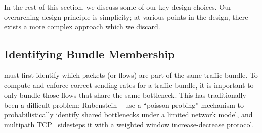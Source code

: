 
In the rest of this section, we discuss some of our key design choices.
Our overarching design principle is simplicity; at various points in the design, there exists a more complex approach which we discard.

\subsection{Identifying Bundle Membership}\label{s:design:membership}
\name must first identify which packets (or flows) are part of the same traffic bundle.
To compute and enforce correct sending rates for a traffic bundle, it is important to only bundle those flows that share the same bottleneck.
This has traditionally been a difficult problem; 
Rubenstein \etal~\cite{active-sharedbottlenecks} use a ``poisson-probing'' mechanism to probabilistically identify shared bottlenecks under a limited network model, and
multipath TCP~\cite{mptcp} sidesteps it with a weighted window increase-decrease protocol.

